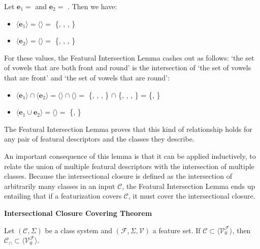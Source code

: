 \documentclass[11pt, oneside]{article}   	%
\newenvironment{clump}
{
	\edef\myindent{\the\parindent}
	\noindent\begin{minipage}{\textwidth}
	\setlength\parindent{\myindent}\fussy
}
{
	\end{minipage}
}
\begin{document}
\noindent Let $\mathbf{e}_1 =$  and $\mathbf{e}_2 =$ . Then we have: \begin{itemize}
    \item $\langle \mathbf{e}_1 \rangle = \langle$$\rangle =$ \{\textipa{\oe}, , , \}
    \item $\langle \mathbf{e}_2 \rangle = \langle$$\rangle =$ \{\textipa{\oe}, , , \}
    \end{itemize}
\noindent For these values, the Featural Intersection Lemma cashes out as follows: `the set of vowels that are both front and round' is the intersection of `the set of vowels that are front' and `the set of vowels that are round':
 
\begin{itemize}
    \item $\langle \mathbf{e}_1 \rangle \cap \langle \mathbf{e}_2 \rangle =  \langle$$\rangle \cap \langle$$\rangle =$ \{\textipa{\oe}, , , \} $\cap$ \{\textipa{\oe}, , , \} = \{\textipa{\oe}, \}
    \item $\langle \mathbf{e}_1 \cup \mathbf{e}_2 \rangle = \langle$$\rangle =$ \{\textipa{\oe}, \}
\end{itemize}

\noindent The Featural Intersection Lemma proves that this kind of relationship holds for any pair of featural descriptors and the classes they describe.

An important consequence of this lemma is that it can be applied inductively, to relate the union of multiple featural descriptors with the intersection of multiple classes. Because the intersectional closure is defined as the intersection of arbitrarily many classes in an input $\mathcal C$, the Featural Intersection Lemma ends up entailing that if a featurization covers $\mathcal C$, it must cover the intersectional closure.

\begin{clump}
\vspace{\baselineskip} \noindent \textbf{Intersectional Closure Covering Theorem}

Let $(\mathcal C, \Sigma)$ be a class system and $(\mathcal F, \Sigma, \mathcal V)$ a feature set. If $\mathcal C \subset \langle \mathcal V_0^\mathcal F \rangle$, then $\mathcal C_\cap \subset\langle \mathcal V_0^\mathcal F \rangle $.
\end{clump}
\end{document}
